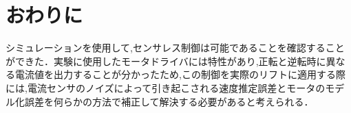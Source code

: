 \chapter{おわりに}
シミュレーションを使用して,センサレス制御は可能であることを確認することができた．実験に使用したモータドライバには特性があり,正転と逆転時に異なる電流値を出力することが分かったため,この制御を実際のリフトに適用する際には,電流センサのノイズによって引き起こされる速度推定誤差とモータのモデル化誤差を何らかの方法で補正して解決する必要があると考えられる．